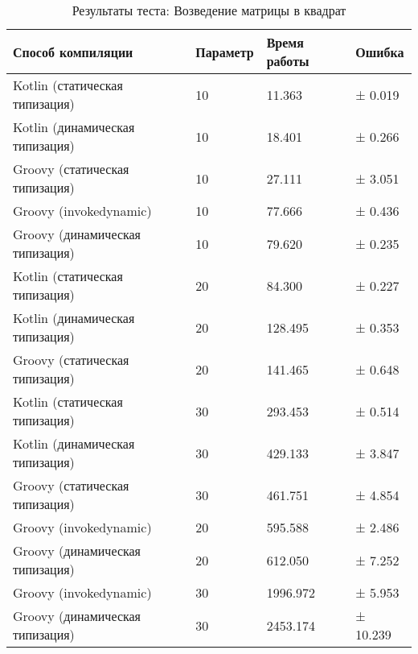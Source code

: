     
    
    \begin{table}[h]
\caption{\label{tab:matrixSquareBenchResults}Результаты теста: Возведение матрицы в квадрат}
\begin{center}
\begin{tabular}{|l|l|l|l|}
\hline
Способ компиляции & Параметр	& Время работы & Ошибка \\
\hline
Kotlin (статическая типизация)            & 10 &   11.363 & ±  0.019 \\
Kotlin (динамическая типизация)           & 10 &   18.401 & ±  0.266 \\
Groovy (статическая типизация)            & 10 &   27.111 & ±  3.051 \\
Groovy (invokedynamic)                    & 10 &   77.666 & ±  0.436 \\
Groovy (динамическая типизация)           & 10 &   79.620 & ±  0.235 \\
Kotlin (статическая типизация)            & 20 &   84.300 & ±  0.227 \\
Kotlin (динамическая типизация)           & 20 &  128.495 & ±  0.353 \\
Groovy (статическая типизация)            & 20 &  141.465 & ±  0.648 \\
Kotlin (статическая типизация)            & 30 &  293.453 & ±  0.514 \\
Kotlin (динамическая типизация)           & 30 &  429.133 & ±  3.847 \\
Groovy (статическая типизация)            & 30 &  461.751 & ±  4.854 \\
Groovy (invokedynamic)                    & 20 &  595.588 & ±  2.486 \\
Groovy (динамическая типизация)           & 20 &  612.050 & ±  7.252 \\
Groovy (invokedynamic)                    & 30 & 1996.972 & ±  5.953 \\
Groovy (динамическая типизация)           & 30 & 2453.174 & ± 10.239 \\
\hline
\end{tabular}
\end{center}
\end{table} 


